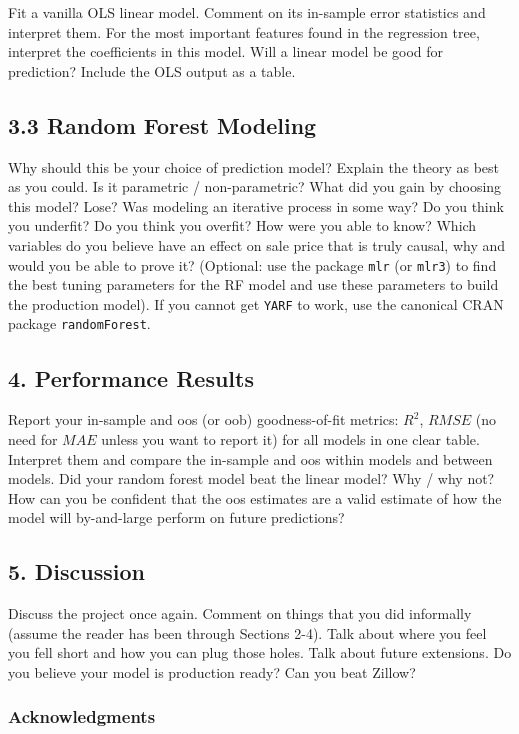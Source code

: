 \documentclass[12pt]{article}
\begin{document}
\begin{tcolorbox}
Fit a vanilla OLS linear model. Comment on its in-sample error statistics and interpret them. For the most important features found in the regression tree, interpret the coefficients in this model. Will a linear model be good for prediction? Include the OLS output as a table.

\subsection*{3.3 Random Forest Modeling}

Why should this be your choice of prediction model? Explain the theory as best as you could. Is it parametric / non-parametric? What did you gain by choosing this model? Lose? Was modeling an iterative process in some way? Do you think you underfit? Do you think you overfit? How were you able to know? Which variables do you believe have an effect on sale price that is truly causal, why and would you be able to prove it? (Optional: use the package \texttt{mlr} (or \texttt{mlr3}) to find the best tuning parameters for the RF model and use these parameters to build the production model). If you cannot get \texttt{YARF} to work, use the canonical CRAN package \texttt{randomForest}.

\subsection*{4. Performance Results}

Report your in-sample and oos (or oob) goodness-of-fit metrics: $R^2$, $RMSE$ (no need for $MAE$ unless you want to report it) for all models in one clear table. Interpret them and compare the in-sample and oos within models and between models. Did your random forest model beat the linear model? Why / why not? How can you be confident that the oos estimates are a valid estimate of how the model will by-and-large perform on future predictions?  

\subsection*{5. Discussion}

Discuss the project once again. Comment on things that you did informally (assume the reader has been through Sections 2-4). Talk about where you feel you fell short and how you can plug those holes. Talk about future extensions. Do you believe your model is production ready? Can you beat Zillow?


\subsubsection*{Acknowledgments}


\end{tcolorbox}
\end{document}
